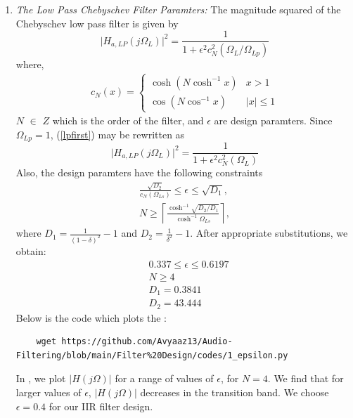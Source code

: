 \documentclass[article]{IEEEtran}
\theoremstyle{remark}
\numberwithin{equation}{subsection}
\begin{document}
\begin{enumerate}
\item {\em The Low Pass Chebyschev Filter Paramters:}  The magnitude squared of the Chebyschev low pass filter is given by 
\begin{equation}
\label{lpfirst}
\vert H_{a,LP}(j\Omega_L)\vert^2 = \frac{1}{1 + \epsilon^2c_N^2(\Omega_L/\Omega_{Lp})}
\end{equation}
where,
\begin{align}
c_N(x) =
    \begin{cases}
   \cosh(N \cosh^{-1}x) & x > 1 \nonumber \\
   \cos(N \cos^{-1}x) & |x| \leq 1 
    \end{cases}
\end{align} $N$ $\in$ $Z$ which is the order of the filter, and $\epsilon$ are design paramters.  Since $\Omega_{Lp} = 1$, (\ref{lpfirst}) may be rewritten as
\begin{equation}
\label{lpsecond}
\vert H_{a,LP}(j\Omega_L)\vert^2 = \frac{1}{1 + \epsilon^2c_N^2(\Omega_L)}
\end{equation}
Also, the design paramters have the following constraints
\begin{eqnarray}
\label{lpdesign}
\frac{\sqrt{D_2}}{c_N(\Omega_{Ls})} \leq \epsilon \leq \sqrt{D_1}, \nonumber \\
N \geq \left\lceil \frac{\cosh^{-1}\sqrt{D_2/D_1}}{\cosh^{-1}\Omega_{Ls}} \right\rceil,
\end{eqnarray}
where $D_1 = \frac{1}{(1 - \delta)^2}-1$ and $D_2 = \frac{1}{\delta^2} - 1$.  After appropriate substitutions,
we obtain:
\begin{align}
    &0.337 \leq \epsilon \leq 0.6197\\
    &N \geq 4 \\
    &D_1 = 0.3841\\
    &D_2 = 43.444
\end{align}
Below is the code which plots the :
\begin{lstlisting}
    wget https://github.com/Avyaaz13/Audio-Filtering/blob/main/Filter%20Design/codes/1_epsilon.py
\end{lstlisting}
  In , we plot $\vert H(j\Omega)\vert$ for a range of values of $\epsilon$, for $N = 4$. We find that for larger values of $\epsilon$, $|H(j\Omega)|$ decreases in the transition band.  We choose $\epsilon = 0.4$  for our IIR filter design.  
\begin{figure}[!ht]
\centering

\end{figure}
\end{enumerate}
\end{document}
